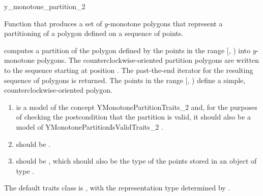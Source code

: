\begin{ccRefFunction}{y_monotone_partition_2}

\ccDefinition

Function that produces a set of $y$-monotone polygons that 
represent a partitioning of a polygon defined on a sequence of points.


{
computes a partition of the polygon defined 
by the points in the range [, ) into $y$-monotone 
polygons. The counterclockwise-oriented partition polygons are written to
the sequence starting at position .  The past-the-end iterator for 
the resulting sequence of polygons is returned.
\ccPrecond The points in the range [, ) define a
simple, counterclockwise-oriented polygon.
}

\begin{enumerate}
    \item {} is a model of the concept YMonotonePartitionTraits\_2%
           and, for the purposes
          of checking the postcondition that the partition is valid, it should 
          also be a model of YMonotonePartitionIsValidTraits\_2%
          .
    \item {} should be 
          .
    \item {} should be ,
          which should also be the type of the points stored in an object
          of type .
\end{enumerate}

The default traits class  is ,
with the representation type determined by .

\ccSeeAlso
{} \\
 \\
 \\
 \\


\end{ccRefFunction}
